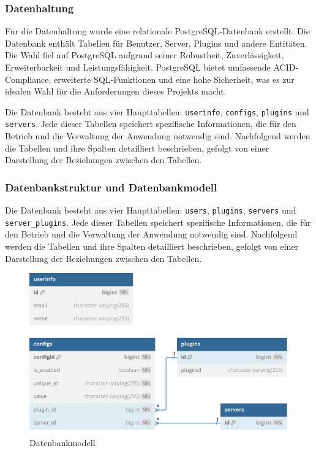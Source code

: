 \subsubsection{Datenhaltung}\label{datenhaltung}

Für die Datenhaltung wurde eine relationale PostgreSQL-Datenbank erstellt. Die Datenbank enthält Tabellen für Benutzer, Server, Plugins und andere Entitäten. Die Wahl fiel auf PostgreSQL aufgrund seiner Robustheit, Zuverlässigkeit, Erweiterbarkeit und Leistungsfähigkeit. PostgreSQL bietet umfassende ACID-Compliance, erweiterte SQL-Funktionen und eine hohe Sicherheit, was es zur idealen Wahl für die Anforderungen dieses Projekts macht.

Die Datenbank besteht aus vier Haupttabellen: \texttt{userinfo}, \texttt{configs}, \texttt{plugins} und \texttt{servers}. Jede dieser Tabellen speichert spezifische Informationen, die für den Betrieb und die Verwaltung der Anwendung notwendig sind. Nachfolgend werden die Tabellen und ihre Spalten detailliert beschrieben, gefolgt von einer Darstellung der Beziehungen zwischen den Tabellen.

\subsubsection{Datenbankstruktur und Datenbankmodell}\label{datenbankstruktur-und-datenbankmodell}

Die Datenbank besteht aus vier Haupttabellen: \texttt{users}, \texttt{plugins}, \texttt{servers} und \texttt{server\_plugins}. Jede dieser Tabellen speichert spezifische Informationen, die für den Betrieb und die Verwaltung der Anwendung notwendig sind. Nachfolgend werden die Tabellen und ihre Spalten detailliert beschrieben, gefolgt von einer Darstellung der Beziehungen zwischen den Tabellen.

\begin{figure}[!htbp]
  \centering
  \includegraphics[width=\textwidth]{images/20240529-dbschema.png}
  \caption{Datenbankmodell}\label{fig:database-schema}
\end{figure}
  
